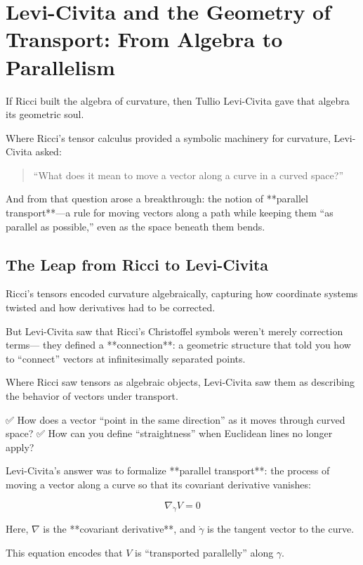 \section{Levi-Civita and the Geometry of Transport: From Algebra to Parallelism}

If Ricci built the algebra of curvature,  
then Tullio Levi-Civita gave that algebra its geometric soul.

Where Ricci’s tensor calculus provided a symbolic machinery for curvature,  
Levi-Civita asked:

\begin{quote}
“What does it mean to move a vector along a curve in a curved space?”
\end{quote}

And from that question arose a breakthrough:  
the notion of **parallel transport**—a rule for moving vectors along a path while keeping them “as parallel as possible,” even as the space beneath them bends.

\bigskip

\subsection*{The Leap from Ricci to Levi-Civita}

Ricci’s tensors encoded curvature algebraically,  
capturing how coordinate systems twisted and how derivatives had to be corrected.

But Levi-Civita saw that Ricci’s Christoffel symbols weren’t merely correction terms—  
they defined a **connection**: a geometric structure that told you how to “connect” vectors at infinitesimally separated points.

Where Ricci saw tensors as algebraic objects,  
Levi-Civita saw them as describing the behavior of vectors under transport.

✅ How does a vector “point in the same direction” as it moves through curved space?  
✅ How can you define “straightness” when Euclidean lines no longer apply?

Levi-Civita’s answer was to formalize **parallel transport**:  
the process of moving a vector along a curve so that its covariant derivative vanishes:

\[
\nabla_{\dot{\gamma}} V = 0
\]

Here, \( \nabla \) is the **covariant derivative**, and \( \dot{\gamma} \) is the tangent vector to the curve.

This equation encodes that \( V \) is “transported parallelly” along \( \gamma \).

